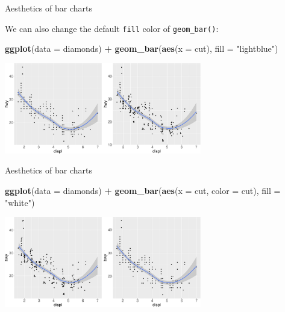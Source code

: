 \documentclass[ignorenonframetext,]{beamer}
\newenvironment{Shaded}{\begin{snugshade}}{\end{snugshade}}
\newcommand{\DataTypeTok}[1]{\textcolor[rgb]{0.13,0.29,0.53}{#1}}
\newcommand{\KeywordTok}[1]{\textcolor[rgb]{0.13,0.29,0.53}{\textbf{#1}}}
\newcommand{\NormalTok}[1]{#1}
\newcommand{\OperatorTok}[1]{\textcolor[rgb]{0.81,0.36,0.00}{\textbf{#1}}}
\newcommand{\StringTok}[1]{\textcolor[rgb]{0.31,0.60,0.02}{#1}}
\begin{document}
\begin{frame}[fragile]{Aesthetics of bar charts}
\protect\hypertarget{aesthetics-of-bar-charts-1}{}

We can also change the default \texttt{fill} color of
\texttt{geom\_bar()}:

\begin{Shaded}
\begin{Highlighting}[]
\KeywordTok{ggplot}\NormalTok{(}\DataTypeTok{data =}\NormalTok{ diamonds) }\OperatorTok{+}\StringTok{ }
\StringTok{  }\KeywordTok{geom_bar}\NormalTok{(}\KeywordTok{aes}\NormalTok{(}\DataTypeTok{x =}\NormalTok{ cut), }\DataTypeTok{fill =} \StringTok{"lightblue"}\NormalTok{)}
\end{Highlighting}
\end{Shaded}

\begin{center}\includegraphics[height=150px]{data-visualization_files/figure-beamer/unnamed-chunk-133-1} \end{center}

\end{frame}

\begin{frame}[fragile]{Aesthetics of bar charts}
\protect\hypertarget{aesthetics-of-bar-charts-2}{}

\begin{Shaded}
\begin{Highlighting}[]
\KeywordTok{ggplot}\NormalTok{(}\DataTypeTok{data =}\NormalTok{ diamonds) }\OperatorTok{+}\StringTok{ }
\StringTok{  }\KeywordTok{geom_bar}\NormalTok{(}\KeywordTok{aes}\NormalTok{(}\DataTypeTok{x =}\NormalTok{ cut, }\DataTypeTok{color =}\NormalTok{ cut), }\DataTypeTok{fill =} \StringTok{"white"}\NormalTok{)}
\end{Highlighting}
\end{Shaded}

\begin{center}\includegraphics[height=150px]{data-visualization_files/figure-beamer/unnamed-chunk-134-1} \end{center}

\end{frame}
\end{document}
